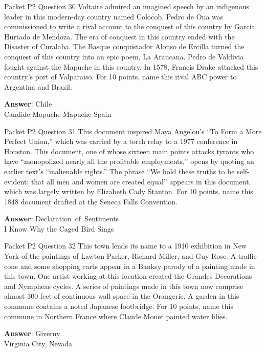 \begin{frame}{Packet P2 Question 30}
Voltaire admired an imagined   speech by an indigenous leader in this modern-day country named Colocob. Pedro de Ona was commissioned to write a rival account to the conquest of this country by Garcia Hurtado de Mendoza. The era of conquest in this country ended with the Disaster of Curalaba. The Basque conquistador Alonso de Ercilla turned the   conquest of this country into an epic poem, La Araucana.   Pedro de Valdivia fought against the Mapuche in this country. In 1578, Francis Drake attacked this country's port of Valparaiso. For 10 points,   name this rival ABC power to Argentina and Brazil.    

\textbf{Answer}: Chile\\
 Candide
 Mapuche
 Mapuche
 Spain
\end{frame}

\begin{frame}{Packet P2 Question 31}
This document inspired Maya Angelou's ``To   Form a More Perfect Union,'' which was carried by a torch relay to a 1977 conference in Houston. This document, one of whose sixteen main points attacks tyrants who have ``monopolized nearly all the profitable employments,''     opens by quoting an earlier text’s “inalienable rights.” The phrase ``We hold these truths to be self-evident:   that all men and women are created equal'' appears in this document, which was largely written by Elizabeth Cady Stanton. For 10 points, name this 1848 document drafted   at the Seneca Falls Convention.

\textbf{Answer}: Declaration\ of\ Sentiments\\
 I Know Why the Caged Bird Sings
\end{frame}

\begin{frame}{Packet P2 Question 32}
This town lends its name to a 1910 exhibition in New York of the paintings of Lawton Parker, Richard Miller, and Guy Rose.   A traffic cone and some shopping carts appear in a Banksy parody of a painting made in this town. One artist working at this location created the Grandes Decorations and Nympheas cycles. A series of paintings made in this town now comprise   almost 300 feet of continuous wall space in the Orangerie. A garden in this commune contains a noted Japanese footbridge. For 10 points, name   this commune in Northern France where Claude Monet painted   water lilies.  

\textbf{Answer}: Giverny\\
 Virginia City, Nevada
\end{frame}

